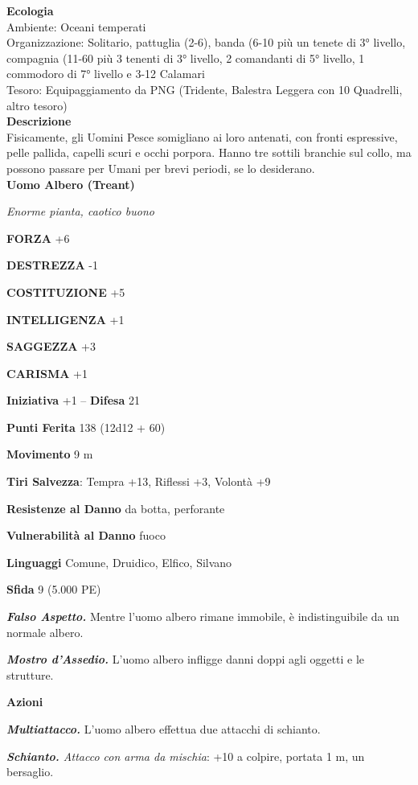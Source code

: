 \begin{multicols}{2}
\textbf{Ecologia}\\
Ambiente: Oceani temperati\\
Organizzazione: Solitario, pattuglia (2-6), banda (6-10 più un tenete di 3° livello, compagnia (11-60 più 3 tenenti di 3° livello, 2 comandanti di 5° livello, 1 commodoro di 7° livello e 3-12 Calamari\\
Tesoro: Equipaggiamento da PNG (Tridente, Balestra Leggera con 10 Quadrelli, altro tesoro)\\
\textbf{Descrizione}\\
Fisicamente, gli Uomini Pesce somigliano ai loro antenati, con fronti espressive, pelle pallida, capelli scuri e occhi porpora. Hanno tre sottili branchie sul collo, ma possono passare per Umani per brevi periodi, se lo desiderano.\\


\medskip{}\textbf{Uomo Albero (Treant)}

\emph{Enorme pianta, caotico buono}

\textbf{FORZA} +6

\textbf{DESTREZZA} -1

\textbf{COSTITUZIONE} +5

\textbf{INTELLIGENZA} +1

\textbf{SAGGEZZA} +3

\textbf{CARISMA} +1

\textbf{Iniziativa} +1 -- \textbf{Difesa} 21

\textbf{Punti Ferita} 138 (12d12 + 60)

\textbf{Movimento} 9 m

\textbf{Tiri Salvezza}: Tempra +13, Riflessi +3, Volontà +9

\textbf{Resistenze al Danno} da botta, perforante

\textbf{Vulnerabilità al Danno} fuoco

\textbf{Linguaggi} Comune, Druidico, Elfico, Silvano

\textbf{Sfida} 9 (5.000 PE)

\emph{\textbf{Falso Aspetto.}} Mentre l'uomo albero rimane immobile, è indistinguibile da un normale albero.

\emph{\textbf{Mostro d'Assedio.}} L'uomo albero infligge danni doppi agli oggetti e le strutture.

\textbf{Azioni}

\emph{\textbf{Multiattacco.}} L'uomo albero effettua due attacchi di schianto.

\emph{\textbf{Schianto.} Attacco con arma da mischia}: +10 a colpire, portata 1 m, un bersaglio.


\end{multicols}
